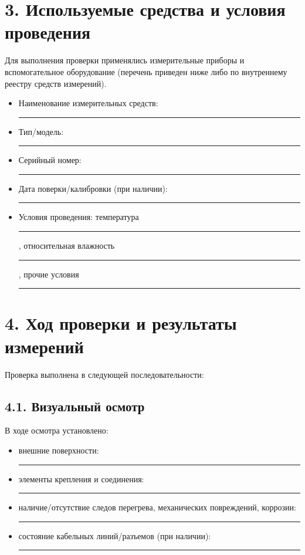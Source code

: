 \documentclass[12pt]{article}
\begin{document}
\vspace{0.5cm}

\section*{3. Используемые средства и условия проведения}
\noindent Для выполнения проверки применялись измерительные приборы и вспомогательное оборудование (перечень приведен ниже либо по внутреннему реестру средств измерений).

\begin{itemize}
    \item Наименование измерительных средств: \rule{0.9\linewidth}{0.4pt}
    \item Тип/модель: \rule{0.9\linewidth}{0.4pt}
    \item Серийный номер: \rule{0.9\linewidth}{0.4pt}
    \item Дата поверки/калибровки (при наличии): \rule{0.7\linewidth}{0.4pt}
    \item Условия проведения: температура \rule{0.4\linewidth}{0.4pt}, относительная влажность \rule{0.4\linewidth}{0.4pt}, прочие условия \rule{0.5\linewidth}{0.4pt}
\end{itemize}

\vspace{0.5cm}

\section*{4. Ход проверки и результаты измерений}
\noindent Проверка выполнена в следующей последовательности:

\subsection*{4.1. Визуальный осмотр}
\noindent В ходе осмотра установлено:
\begin{itemize}
    \item внешние поверхности: \rule{0.85\linewidth}{0.4pt}
    \item элементы крепления и соединения: \rule{0.85\linewidth}{0.4pt}
    \item наличие/отсутствие следов перегрева, механических повреждений, коррозии: \rule{0.85\linewidth}{0.4pt}
    \item состояние кабельных линий/разъемов (при наличии): \rule{0.85\linewidth}{0.4pt}
\end{itemize}
\end{document}
